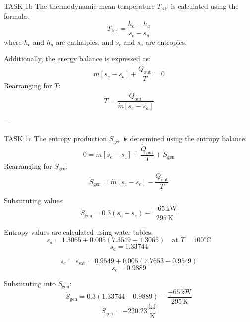 TASK 1b  
The thermodynamic mean temperature \( T_{\text{KF}} \) is calculated using the formula:  
\[
T_{\text{KF}} = \frac{h_e - h_a}{s_e - s_a}
\]  
where \( h_e \) and \( h_a \) are enthalpies, and \( s_e \) and \( s_a \) are entropies.  

Additionally, the energy balance is expressed as:  
\[
\dot{m} \left[ s_e - s_a \right] + \frac{\dot{Q}_{\text{out}}}{T} = 0
\]  
Rearranging for \( T \):  
\[
T = \frac{\dot{Q}_{\text{out}}}{\dot{m} \left[ s_e - s_a \right]}
\]  

---

TASK 1c  
The entropy production \( \dot{S}_{\text{gen}} \) is determined using the entropy balance:  
\[
0 = \dot{m} \left[ s_e - s_a \right] + \frac{\dot{Q}_{\text{out}}}{T} + \dot{S}_{\text{gen}}
\]  
Rearranging for \( \dot{S}_{\text{gen}} \):  
\[
\dot{S}_{\text{gen}} = \dot{m} \left[ s_a - s_e \right] - \frac{\dot{Q}_{\text{out}}}{T}
\]  

Substituting values:  
\[
\dot{S}_{\text{gen}} = 0.3 \left( s_a - s_e \right) - \frac{-65 \, \text{kW}}{295 \, \text{K}}
\]  

Entropy values are calculated using water tables:  
\[
s_a = 1.3065 + 0.005 \left( 7.3549 - 1.3065 \right) \quad \text{at } T = 100^\circ\text{C}
\]  
\[
s_a = 1.33744
\]  

\[
s_e = s_{\text{sat}} = 0.9549 + 0.005 \left( 7.7653 - 0.9549 \right)
\]  
\[
s_e = 0.9889
\]  

Substituting into \( \dot{S}_{\text{gen}} \):  
\[
\dot{S}_{\text{gen}} = 0.3 \left( 1.33744 - 0.9889 \right) - \frac{-65 \, \text{kW}}{295 \, \text{K}}
\]  
\[
\dot{S}_{\text{gen}} = -220.23 \, \frac{\text{kJ}}{\text{K}}
\]  

